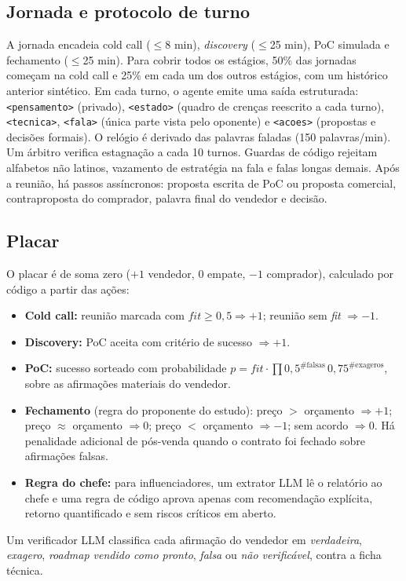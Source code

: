 \documentclass[11pt,a4paper]{article}
\begin{document}
\subsection{Jornada e protocolo de turno}
A jornada encadeia cold call ($\le$8 min), \emph{discovery} ($\le$25 min), PoC simulada e fechamento ($\le$25 min). Para cobrir todos os estágios, 50\% das jornadas começam na cold call e 25\% em cada um dos outros estágios, com um histórico anterior sintético. Em cada turno, o agente emite uma saída estruturada: \texttt{<pensamento>} (privado), \texttt{<estado>} (quadro de crenças reescrito a cada turno), \texttt{<tecnica>}, \texttt{<fala>} (única parte vista pelo oponente) e \texttt{<acoes>} (propostas e decisões formais). O relógio é derivado das palavras faladas (150 palavras/min). Um árbitro verifica estagnação a cada 10 turnos. Guardas de código rejeitam alfabetos não latinos, vazamento de estratégia na fala e falas longas demais. Após a reunião, há passos assíncronos: proposta escrita de PoC ou proposta comercial, contraproposta do comprador, palavra final do vendedor e decisão.

\subsection{Placar}
O placar é de soma zero ($+1$ vendedor, $0$ empate, $-1$ comprador), calculado por código a partir das ações:
\begin{itemize}
  \item \textbf{Cold call:} reunião marcada com $\textit{fit}\ge0{,}5 \Rightarrow +1$; reunião sem \emph{fit} $\Rightarrow -1$.
  \item \textbf{Discovery:} PoC aceita com critério de sucesso $\Rightarrow +1$.
  \item \textbf{PoC:} sucesso sorteado com probabilidade $p=\textit{fit}\cdot\prod 0{,}5^{\#\text{falsas}}\,0{,}75^{\#\text{exageros}}$, sobre as afirmações materiais do vendedor.
  \item \textbf{Fechamento} (regra do proponente do estudo): preço $>$ orçamento $\Rightarrow +1$; preço $\approx$ orçamento $\Rightarrow 0$; preço $<$ orçamento $\Rightarrow -1$; sem acordo $\Rightarrow 0$. Há penalidade adicional de pós-venda quando o contrato foi fechado sobre afirmações falsas.
  \item \textbf{Regra do chefe:} para influenciadores, um extrator LLM lê o relatório ao chefe e uma regra de código aprova apenas com recomendação explícita, retorno quantificado e sem riscos críticos em aberto.
\end{itemize}
Um verificador LLM classifica cada afirmação do vendedor em \emph{verdadeira}, \emph{exagero}, \emph{roadmap vendido como pronto}, \emph{falsa} ou \emph{não verificável}, contra a ficha técnica.
\end{document}
